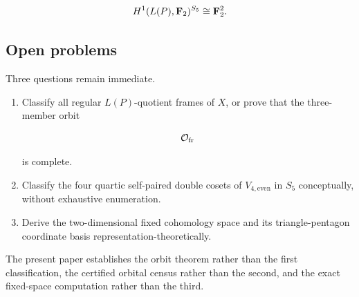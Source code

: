 \[
H^1(L(P),\mathbf F_2)^{S_5}\cong\mathbf F_2^2.
\]

\subsection{Open problems}

Three questions remain immediate.

\begin{enumerate}

\item
Classify all regular \(L(P)\)-quotient frames of \(X\), or prove that the
three-member orbit

\[
\mathcal O_{\mathrm{fr}}
\]

is complete.

\item
Classify the four quartic self-paired double cosets of
\(V_{4,\mathrm{even}}\) in \(S_5\) conceptually, without exhaustive
enumeration.

\item
Derive the two-dimensional fixed cohomology space and its
triangle-pentagon coordinate basis representation-theoretically.

\end{enumerate}

The present paper establishes the orbit theorem rather than the first
classification, the certified orbital census rather than the second, and
the exact fixed-space computation rather than the third.
